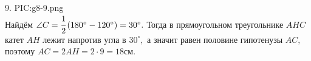 9. {{PIC:g8-9.png}}\\
Найдём $\angle C=\cfrac{1}{2}\left(180^\circ-120^\circ\right)=30^\circ.$ Тогда в прямоугольном треугольнике $AHC$ катет $AH$ лежит напротив угла в $30^\circ,$ а значит равен половине гипотенузы $AC,$ поэтому $AC=2AH=2\cdot9=18$см.\\
